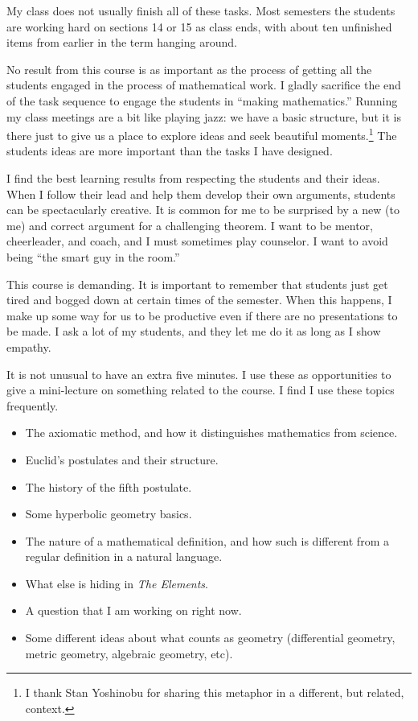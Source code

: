 \begin{annotation}
My class does not usually finish all of these tasks. Most semesters the students are working hard on sections 14 or 15 as class ends, with about ten unfinished items from earlier in the term hanging around.

No result from this course is as important as the process of getting all the students engaged in the process of mathematical work. I gladly sacrifice the end of the task sequence to engage the students in ``making mathematics.'' Running my class meetings are a bit like playing jazz: we have a basic structure, but it is there just to give us a place to explore ideas and seek beautiful moments.\footnote{I thank Stan Yoshinobu for sharing this metaphor in a different, but related, context.} The students ideas are more important than the tasks I have designed.

I find the best learning results from respecting the students and their ideas. When I follow their lead and help them develop their own arguments, students can be spectacularly creative. It is common for me to be surprised by a new (to me)  and correct argument for a challenging theorem. I want to be mentor, cheerleader, and coach, and I must sometimes play counselor. I want to avoid being ``the smart guy in the room.''

This course is demanding. It is important to remember that students just get tired and bogged down at certain times of the semester. When this happens, I make up some way for us to be productive even if there are no presentations to be made. I ask a lot of my students, and they let me do it as long as I show empathy.

It is not unusual to have an extra five minutes. I use these as opportunities to give a mini-lecture on something related to the course. I find I use these topics frequently.
\begin{itemize}
\item The axiomatic method, and how it distinguishes mathematics from science.
\item Euclid's postulates and their structure.
\item The history of the fifth postulate.
\item Some hyperbolic geometry basics.
\item The nature of a mathematical definition, and how such is different from a regular definition in a natural language.
\item What else is hiding in \emph{The Elements}.
\item A question that I am working on right now.
\item Some different ideas about what counts as geometry (differential geometry, metric geometry, algebraic geometry, etc).
\end{itemize}


\end{annotation}
